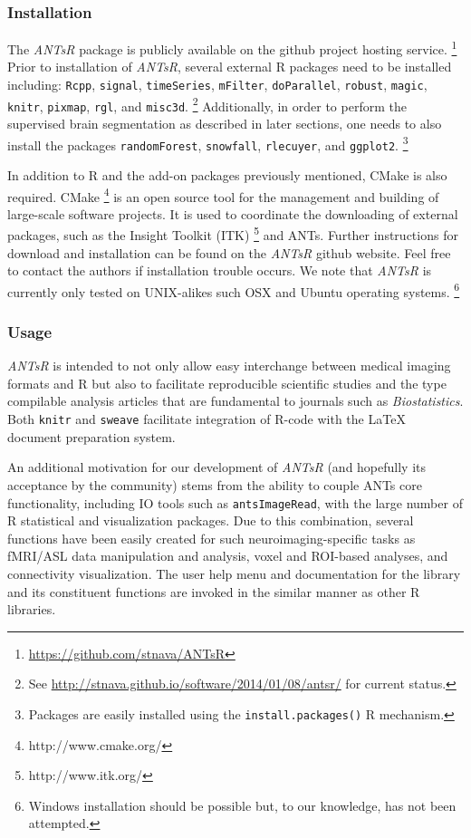 \documentclass[preprint,authoryear,review,12pt]{elsarticle}
\begin{document}
\subsubsection{Installation}

The \textit{ANTsR} package is publicly available on the github project hosting service.%
\footnote{
\href{https://github.com/stnava/ANTsR}{https://github.com/stnava/ANTsR}
}
Prior to installation of \textit{ANTsR}, several external R packages
need to be installed including: \verb#Rcpp#, \verb#signal#, \verb#timeSeries#, 
\verb#mFilter#, \verb#doParallel#, \verb#robust#, \verb#magic#, \verb#knitr#, \verb#pixmap#, 
\verb#rgl#, and \verb#misc3d#.%
\footnote{
See \href{http://stnava.github.io/software/2014/01/08/antsr/}{http://stnava.github.io/software/2014/01/08/antsr/} for current status.}
Additionally, in order
to perform the supervised brain segmentation as described 
in later sections, one needs to also install the packages
\verb#randomForest#, \verb#snowfall#, \verb#rlecuyer#,
and \verb#ggplot2#.%
\footnote{
Packages are easily installed using the {\tt install.packages()} R mechanism.
} 

In addition to R and the add-on packages previously mentioned, CMake is also 
required.  CMake%
\footnote{
http://www.cmake.org/
}
is an open source tool for the management and building of 
large-scale software projects.  It is used
to coordinate the downloading of external packages,
such as the Insight Toolkit (ITK)%
\footnote{
http://www.itk.org/
}
and ANTs.  Further instructions for download and
installation can be found on the \textit{ANTsR} github website.  Feel
free to contact the authors if installation trouble occurs.  We note
that \textit{ANTsR} is currently only tested on UNIX-alikes such OSX and Ubuntu
operating systems.%
\footnote{Windows installation should be possible
but, to our knowledge, has not been attempted.}

\subsubsection{Usage}
\textit{ANTsR} is intended to not only allow easy interchange between
medical imaging formats and R but also to facilitate
reproducible scientific studies and the type compilable analysis
articles that are fundamental to journals such as
\textit{Biostatistics}.  Both \verb#knitr# and \verb#sweave#
facilitate integration of R-code with the LaTeX document
preparation system.  

An additional motivation for our development of \textit{ANTsR} (and
hopefully its acceptance by the community) 
stems from the ability to couple ANTs core 
functionality, including IO tools such as \verb#antsImageRead#, 
with the large number of R statistical and
visualization packages.  Due to this combination, several
functions have been easily created for such neuroimaging-specific 
tasks as fMRI/ASL data manipulation and analysis,
voxel and ROI-based  analyses,
and connectivity visualization. %
The user help menu and documentation for the library  and its
constituent functions are invoked in the similar manner as other
R libraries.
\end{document}
